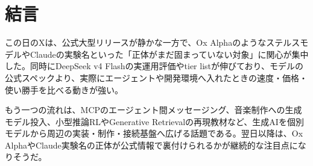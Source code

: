 \section*{結言}
この日のXは、公式大型リリースが静かな一方で、Ox AlphaのようなステルスモデルやClaudeの実験名といった「正体がまだ固まっていない対象」に関心が集中した。同時にDeepSeek v4 Flashの実運用評価やtier listが伸びており、モデルの公式スペックより、実際にエージェントや開発環境へ入れたときの速度・価格・使い勝手を比べる動きが強い。

もう一つの流れは、MCPのエージェント間メッセージング、音楽制作への生成モデル投入、小型推論RLやGenerative Retrievalの再現教材など、生成AIを個別モデルから周辺の実装・制作・接続基盤へ広げる話題である。翌日以降は、Ox AlphaやClaude実験名の正体が公式情報で裏付けられるかが継続的な注目点になりそうだ。
